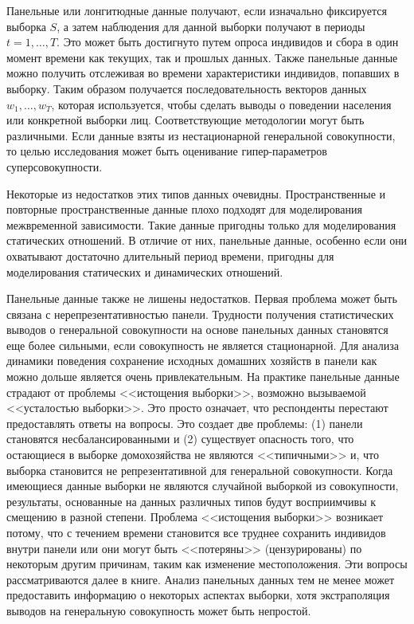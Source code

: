 Панельные или лонгитюдные данные получают, если изначально фиксируется выборка $S$, а затем наблюдения для данной выборки получают в периоды $t=1, \dots, T$. Это может быть достигнуто путем опроса индивидов и сбора в один момент времени как текущих, так и прошлых данных. Также панельные данные можно получить отслеживая во времени характеристики индивидов, попавших в выборку. Таким образом получается последовательность  векторов данных ${w_{1}, \dots, w_{T}}$, которая используется, чтобы сделать выводы о поведении населения или конкретной выборки лиц. Соответствующие методологии  могут быть различными. Если данные взяты из нестационарной генеральной совокупности, то целью исследования может быть оценивание гипер-параметров суперсовокупности.


Некоторые из недостатков этих типов данных очевидны. Пространственные и повторные пространственные данные плохо подходят для моделирования межвременной зависимости. Такие данные пригодны только для моделирования статических отношений. В отличие от них, панельные  данные, особенно если они охватывают достаточно длительный период времени, пригодны для моделирования статических и динамических отношений.


Панельные данные также не лишены недостатков. Первая проблема может быть связана с нерепрезентативностью панели. Трудности получения статистических выводов о генеральной совокупности на основе панельных данных становятся еще более сильными, если совокупность не является стационарной. 
Для анализа динамики поведения сохранение исходных домашних хозяйств в панели как можно дольше является очень привлекательным. На практике панельные данные страдают от проблемы <<истощения выборки>>, возможно вызываемой <<усталостью выборки>>. Это просто означает, что респонденты перестают предоставлять ответы на вопросы. Это создает две проблемы: (1) панели становятся несбалансированными и (2) существует опасность того, что остающиеся в выборке домохозяйства не являются <<типичными>> и, что выборка становится не репрезентативной для генеральной совокупности. 
Когда имеющиеся данные выборки не являются случайной выборкой из совокупности, результаты, основанные на данных различных типов будут восприимчивы к смещению в разной степени. Проблема <<истощения выборки>> возникает потому, что с течением времени становится все труднее сохранить индивидов внутри панели или они могут быть <<потеряны>> (цензурированы) по некоторым другим причинам, таким как изменение местоположения. Эти вопросы рассматриваются далее в книге. Анализ панельных данных тем не менее может предоставить информацию о некоторых аспектах выборки, хотя экстраполяция выводов на генеральную совокупность  может быть непростой.


